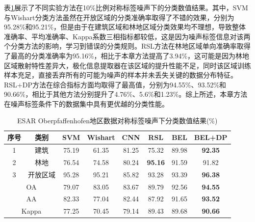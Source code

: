 表\ref{tab:ober_res_4}展示了不同实验方法在10\%比例对称标签噪声下的分类数值结果。其中，SVM与Wishart分类方法虽然在开放区域的分类准确率取得了不错的效果，分别为95.28\%和95.21\%，但是由于在建筑区域和林地区域分类效果均不理想，导致整体准确率、平均准确率、Kappa系数三相指标都较低，这是因为噪声标签信息对该两个分类方法的影响，学习到错误的分类规则。RSL方法在林地区域单向准确率取得了最高的分类准确率为95.16\%，相比于本章方法提高了3.94\%，这可能是因为林地区域散射特性差异大，极化信息提取器在该区域的提升性能不足，同时该区域训练样本充足，直接丢弃所有的可能为噪声的样本并未丢失关键的数据分布特征。RSL+DP方法在综合指标方面均取得了最高值，分别为94.55\%、93.52\%和90.66\%，相比于其他方法分别提升了4.76\%、5.6\%和1.23\%。综上所述，本章方法在噪声标签条件下的数据集中具有更优越的分类性能。

\begin{table}[ht!]
  \caption{ESAR Oberpfaffenhofen地区数据对称标签噪声下分类数值结果(\%)}
  \label{tab:ober_res_4}
  \begin{tabular}{cccccccc}
    \toprule[1.5bp]
    序号                        & 类别    & SVM   & Wishart & CNN   & RSL            & BEL            & BEL+DP         \\
    \midrule[0.75bp]
    1                         & 建筑    & 75.19 & 61.35   & 81.25 & 75.32          & 89.98          & \textbf{92.35} \\
    2                         & 林地    & 76.54 & 74.58   & 80.24 & \textbf{95.16} & 91.59          & 91.82          \\
    3                         & 开放区域  & 95.28 & 95.21   & 85.82 & 93.28          & 93.39          & \textbf{96.38} \\
    \midrule[0.75bp]
    \multicolumn{2}{c}{OA}    & 79.07 & 83.05 & 83.67   & 89.79 & 92.56          & \textbf{94.55}                  \\
    \multicolumn{2}{c}{AA}    & 82.33 & 77.04 & 82.44   & 87.92 & 91.65          & \textbf{93.52}                  \\
    \multicolumn{2}{c}{Kappa} & 77.25 & 70.45 & 79.14   & 89.43 & 89.68          & \textbf{90.66}                  \\
    \bottomrule[0.75bp]
  \end{tabular}
\end{table}

